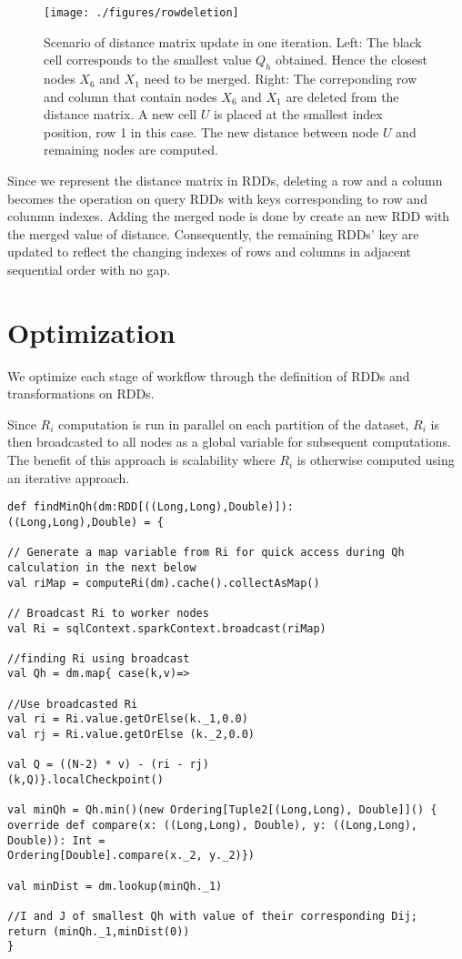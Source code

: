 \begin{figure}
	\texttt{[image: ./figures/rowdeletion]}
	{\caption{Scenario of distance matrix update in one iteration. Left: The black cell corresponds to the smallest value $Q_h$ obtained. Hence the closest nodes $X_6$ and $X_1$ need to be merged. Right: The correponding row and column that contain nodes $X_6$ and $X_1$  are deleted from the distance matrix. A new cell $U$ is placed at the smallest index position, row 1 in this case. The new distance between node $U$ and remaining nodes are computed.}
		\label{fig:reducing-dimension}}
\end{figure}

Since we represent the distance matrix in RDDs, deleting a row and a column becomes the operation on query RDDs with keys corresponding to row and colunmn indexes. Adding the merged node is done by create an new RDD with the merged value of distance. Consequently, the remaining RDDs' key are updated to reflect the changing indexes of rows and columns in adjacent sequential order with no gap.  

\section{Optimization}
We optimize each stage of workflow through the definition of RDDs and transformations on RDDs.

Since $R_i$ computation is run in parallel on each partition of the dataset, $R_i$ is then broadcasted to all nodes as a global variable for subsequent computations. The benefit of this approach is scalability where $R_i$ is otherwise computed using an iterative approach.

\begin{lstlisting}[style=myScalastyle,caption={Finding two closest nodes with a broadcast  variable},captionpos=b]
def findMinQh(dm:RDD[((Long,Long),Double)]):
((Long,Long),Double) = {

// Generate a map variable from Ri for quick access during Qh calculation in the next below
val riMap = computeRi(dm).cache().collectAsMap()

// Broadcast Ri to worker nodes
val Ri = sqlContext.sparkContext.broadcast(riMap)

//finding Ri using broadcast
val Qh = dm.map{ case(k,v)=>

//Use broadcasted Ri 
val ri = Ri.value.getOrElse(k._1,0.0) 
val rj = Ri.value.getOrElse (k._2,0.0)

val Q = ((N-2) * v) - (ri - rj)
(k,Q)}.localCheckpoint()

val minQh = Qh.min()(new Ordering[Tuple2[(Long,Long), Double]]() {
override def compare(x: ((Long,Long), Double), y: ((Long,Long), Double)): Int =
Ordering[Double].compare(x._2, y._2)})

val minDist = dm.lookup(minQh._1)

//I and J of smallest Qh with value of their corresponding Dij; 
return (minQh._1,minDist(0))
}
\end{lstlisting}

